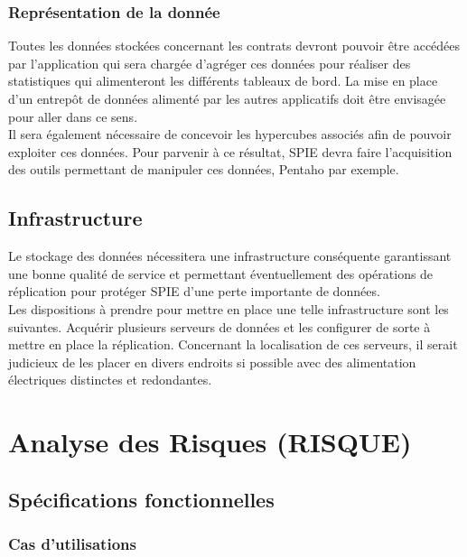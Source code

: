 \subsubsection{Représentation de la donnée}

Toutes les données stockées concernant les contrats devront pouvoir être accédées par l’application qui sera chargée d’agréger ces données pour réaliser des statistiques qui alimenteront les différents tableaux de bord. La mise en place d’un entrepôt de données alimenté par les autres applicatifs doit être envisagée pour aller dans ce sens. \\

Il sera également nécessaire de concevoir les hypercubes associés afin de pouvoir exploiter ces données. Pour parvenir à ce résultat, SPIE devra faire l’acquisition des outils permettant de manipuler ces données, Pentaho par exemple. 

\subsection{Infrastructure}

Le stockage des données nécessitera une infrastructure conséquente garantissant une bonne qualité de service et permettant éventuellement des opérations de réplication pour protéger SPIE d’une perte importante de données. \\

Les dispositions à prendre pour mettre en place une telle infrastructure sont les suivantes. Acquérir plusieurs serveurs de données et les configurer de sorte à mettre en place la réplication. Concernant la localisation de ces serveurs, il serait judicieux de les placer en divers endroits si possible avec des alimentation électriques distinctes et redondantes. 

\section{Analyse des Risques (RISQUE)}%

\subsection{Spécifications fonctionnelles}

\subsubsection{Cas d’utilisations}

